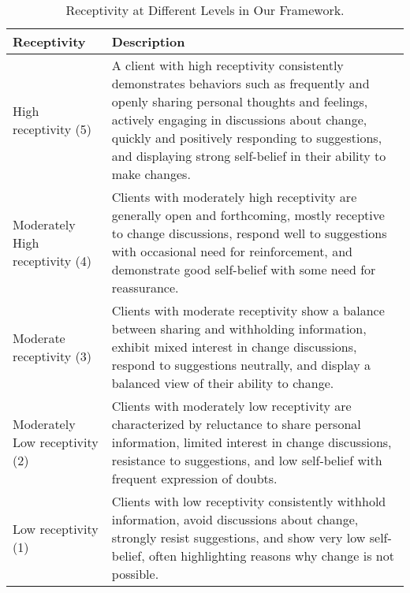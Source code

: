 \begin{table*}[tb]
\centering
\begin{tabularx}{\textwidth}{lX}
\toprule
Receptivity                     & Description                                                                                                                                                                                                                                                                                                      \\ \midrule
High receptivity (5)            & A client with high receptivity consistently demonstrates behaviors such as frequently and openly sharing personal thoughts and feelings, actively engaging in discussions about change, quickly and positively responding to suggestions, and displaying strong self-belief in their ability to make changes. \\ \hline
Moderately High receptivity (4) & Clients with moderately high receptivity are generally open and forthcoming, mostly receptive to change discussions, respond well to suggestions with occasional need for reinforcement, and demonstrate good self-belief with some need for reassurance.                                                     \\ \hline
Moderate receptivity (3)        & Clients with moderate receptivity show a balance between sharing and withholding information, exhibit mixed interest in change discussions, respond to suggestions neutrally, and display a balanced view of their ability to change.                                                                         \\ \hline
Moderately Low receptivity (2)  & Clients with moderately low receptivity are characterized by reluctance to share personal information, limited interest in change discussions, resistance to suggestions, and low self-belief with frequent expression of doubts.                                                                             \\ \hline
Low receptivity (1)             & Clients with low receptivity consistently withhold information, avoid discussions about change, strongly resist suggestions, and show very low self-belief, often highlighting reasons why change is not possible.                                                                                            \\ \bottomrule
\end{tabularx}
\caption{Receptivity at Different Levels in Our Framework.}
\label{tab:receptivity description}
\end{table*}


